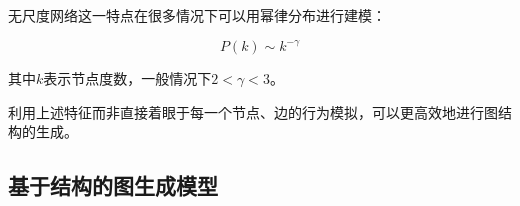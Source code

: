 

无尺度网络这一特点在很多情况下可以用幂律分布进行建模：

\vspace{-8mm}
\begin{equation}
\label{equ:powerlaw}
P(k) \sim k^{-\gamma}
\end{equation}

\noindent 其中$k$表示节点度数，一般情况下$2<\gamma<3$。

利用上述特征而非直接着眼于每一个节点、边的行为模拟，可以更高效地进行图结构的生成。

\subsection{基于结构的图生成模型}
\label{cap:simplegen}

